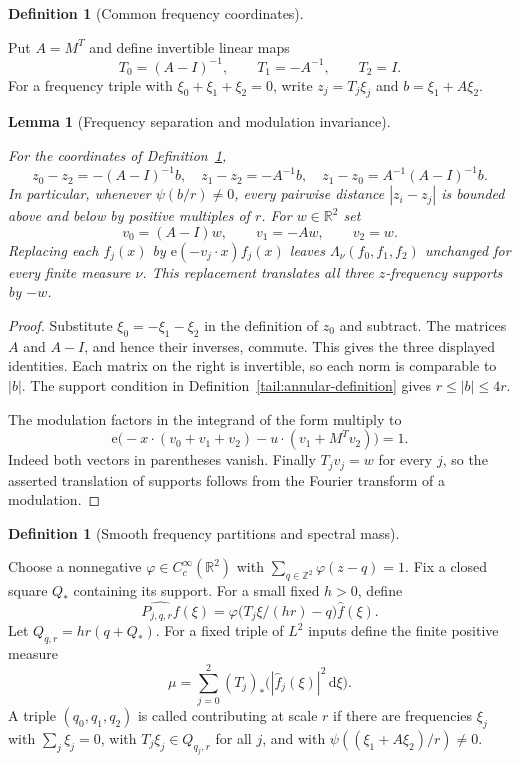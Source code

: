 \documentclass[11pt]{amsart}
\newcommand{\R}{\mathbb R}
\newcommand{\dd}{\,\mathrm d}
\newcommand{\e}{\mathrm e}
\newtheorem{lemma}[theorem]{Lemma}
\theoremstyle{definition}
\newtheorem{definition}[theorem]{Definition}
\theoremstyle{remark}
\numberwithin{equation}{section}
\providecommand{\lean}[1]{}
\providecommand{\leanok}{}
\begin{document}
\begin{definition}[Common frequency coordinates]\label{tail:coordinates}
\lean{Auto.tailA,Auto.tailT}
Put $A=M^T$ and define invertible linear maps
\[
 T_0=(A-I)^{-1},\qquad T_1=-A^{-1},\qquad T_2=I.
\]
For a frequency triple with $\xi_0+\xi_1+\xi_2=0$, write
$z_j=T_j\xi_j$ and $b=\xi_1+A\xi_2$.
\end{definition}

\begin{lemma}[Frequency separation and modulation invariance]
\label{tail:separation}
\lean{Auto.tailV,Auto.tail_separation_identities,Auto.tail_separation_comparable,Auto.tail_separation_modulation,Auto.tail_separation_translate}
\leanok
For the coordinates of Definition~\ref{tail:coordinates},
\[
 z_0-z_2=-(A-I)^{-1}b,\quad
 z_1-z_2=-A^{-1}b,\quad
 z_1-z_0=A^{-1}(A-I)^{-1}b.
\]
In particular, whenever $\psi(b/r)\ne0$, every pairwise distance
$|z_i-z_j|$ is bounded above and below by positive multiples of $r$.
For $w\in\R^2$ set
\[
 v_0=(A-I)w,\qquad v_1=-Aw,\qquad v_2=w.
\]
Replacing each $f_j(x)$ by $\e(-v_j\cdot x)f_j(x)$ leaves
$\Lambda_\nu(f_0,f_1,f_2)$ unchanged for every finite measure $\nu$.
This replacement translates all three $z$-frequency supports by $-w$.
\end{lemma}
\begin{proof}
Substitute $\xi_0=-\xi_1-\xi_2$ in the definition of $z_0$ and
subtract. The matrices $A$ and $A-I$, and hence their inverses,
commute. This gives the three displayed identities. Each matrix on the
right is invertible, so each norm is comparable to $|b|$. The support
condition in Definition~\ref{tail:annular-definition} gives
$r\le|b|\le4r$.

The modulation factors in the integrand of the form multiply to
\[
 \e\big(-x\cdot(v_0+v_1+v_2)-u\cdot(v_1+M^Tv_2)\big)=1.
\]
Indeed both vectors in parentheses vanish. Finally
$T_jv_j=w$ for every $j$, so the asserted translation of supports
follows from the Fourier transform of a modulation.
\end{proof}

\begin{definition}[Smooth frequency partitions and spectral mass]
\label{tail:partition-definition}
\lean{Auto.latticePt,Auto.tailP,Auto.tailSquare,Auto.tailMu,Auto.tailContributing}
Choose a nonnegative $\varphi\in C_c^\infty(\R^2)$ with
$\sum_{q\in\mathbb Z^2}\varphi(z-q)=1$. Fix a closed square
$Q_*$ containing its support. For a small fixed $h>0$, define
\[
 \widehat{P_{j,q,r}f}(\xi)
    =\varphi\big(T_j\xi/(hr)-q\big)\widehat f(\xi).
\]
Let $Q_{q,r}=hr(q+Q_*)$. For a fixed triple of $L^2$
inputs define the finite positive measure
\[
 \mu=\sum_{j=0}^2(T_j)_*
          \big(|\widehat f_j(\xi)|^2\dd\xi\big).
\]
A triple $(q_0,q_1,q_2)$ is called contributing at scale $r$ if there
are frequencies $\xi_j$ with $\sum_j\xi_j=0$, with
$T_j\xi_j\in Q_{q_j,r}$ for all $j$, and with
$\psi((\xi_1+A\xi_2)/r)\ne0$.
\end{definition}
\end{document}
